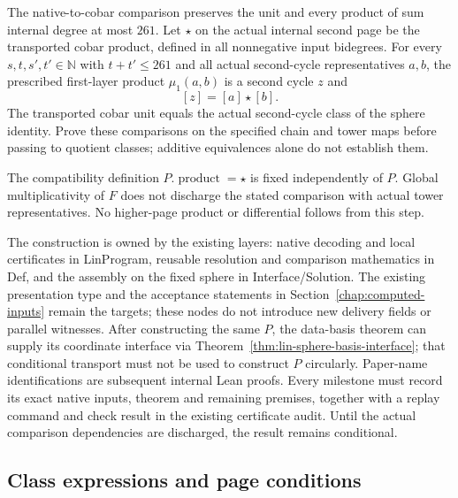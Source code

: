 \begin{proposition}
  \label{prop:lin-native-actual-product}
  \notready
  The native-to-cobar comparison preserves the unit and every product of
  sum internal degree at most $261$. Let $\star$ on the actual internal
  second page be the transported cobar product, defined in all nonnegative
  input bidegrees. For every $s,t,s',t'\in\mathbb N$ with $t+t'\le261$
  and all actual second-cycle representatives $a,b$, the prescribed
  first-layer product $\mu_1(a,b)$ is a second cycle $z$ and
  \[
    [z]=[a]\star[b].
  \]
  The transported cobar unit equals the actual second-cycle class of the
  sphere identity. Prove these comparisons on the specified chain and
  tower maps before passing to quotient classes; additive equivalences
  alone do not establish them.

  The compatibility definition $P.\operatorname{product}=\star$ is
  fixed independently of $P$. Global multiplicativity of $F$ does not
  discharge the stated comparison with actual tower representatives.
  No higher-page product or differential follows from this step.
\end{proposition}

The construction is owned by the existing layers: native decoding and local
certificates in LinProgram, reusable resolution and comparison mathematics
in Def, and the assembly on the fixed sphere in Interface/Solution.
The existing presentation type and the acceptance statements in
Section~\ref{chap:computed-inputs} remain the targets; these nodes do not
introduce new delivery fields or parallel witnesses. After constructing the
same $P$, the data-basis theorem can supply its coordinate interface via
Theorem~\ref{thm:lin-sphere-basis-interface}; that conditional transport must
not be used to construct $P$ circularly. Paper-name identifications are
subsequent internal Lean proofs. Every milestone must record its exact
native inputs, theorem and remaining premises, together with a replay command
and check result in the existing certificate audit. Until the actual
comparison dependencies are discharged, the result remains conditional.

\subsection{Class expressions and page conditions}

